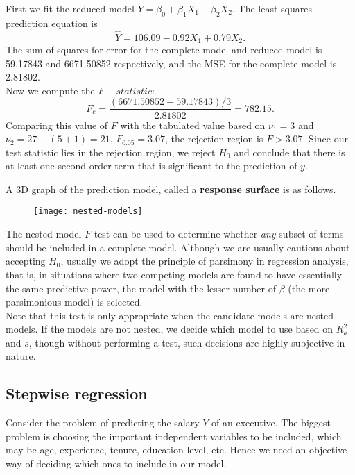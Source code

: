\documentclass{report}
\begin{document}
{\begin{enumerate}
		First we fit the reduced model $Y=\beta_0+\beta_1X_1+\beta_2X_2$. The least squares prediction equation is
		$$\hat{Y}=106.09-0.92X_1+0.79X_2.$$
		The sum of squares for error for the complete model and reduced model is 59.17843 and 6671.50852 respectively, and the MSE for the complete model is 2.81802. \\
		Now we compute the $F-statistic:$
		$$F_c=\frac{(6671.50852-59.17843)/3}{2.81802}=782.15.$$
		Comparing this value of $F$ with the tabulated value based on $\nu_1=3$ and $\nu_2=27-(5+1)=21$, $F_{0.05}=3.07$, the rejection region is $F>3.07$. Since our test statistic lies in the rejection region, we reject $H_0$ and conclude that there is at least one second-order term that is significant to the prediction of $y$.
	\end{enumerate}
	}
	\pagebreak
	A 3D graph of the prediction model, called a \textbf{response surface} is as follows. \\
	\begin{figure}[h]
		\centering
		\texttt{[image: nested-models]}
	\end{figure}
	\vspace{1mm}
	
	
	The nested-model $F$-test can be used to determine whether \textit{any} subset of terms should be included in a complete model. Although we are usually cautious about accepting $H_0$, usually we adopt the principle of parsimony in regression analysis, that is, in situations where two competing models are found to have essentially the same predictive power, the model with the lesser number of $\beta$ (the more parsimonious model) is selected. \\
	
	Note that this test is only appropriate when the candidate models are nested models. If the models are not nested, we decide which model to use based on $R_a^2$ and $s$, though without performing a test, such decisions are highly subjective in nature.
	
	\subsection{Stepwise regression}
	Consider the problem of predicting the salary $Y$ of an executive. The biggest problem is choosing the important independent variables to be included, which may be age, experience, tenure, education level, etc. Hence we need an objective way of deciding which ones to include in our model. \\
	
\end{document}

